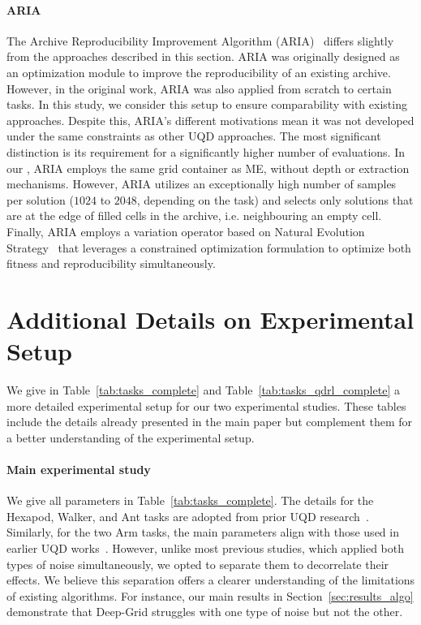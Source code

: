 \paragraph{ARIA}
The Archive Reproducibility Improvement Algorithm (ARIA)~\cite{grillotti2023don} differs slightly from the approaches described in this section. ARIA was originally designed as an optimization module to improve the reproducibility of an existing archive. However, in the original work, ARIA was also applied from scratch to certain tasks. In this study, we consider this setup to ensure comparability with existing approaches.
Despite this, ARIA’s different motivations mean it was not developed under the same constraints as other UQD approaches. The most significant distinction is its requirement for a significantly higher number of evaluations. In our \framework{}, ARIA employs the same grid container as ME, without depth or extraction mechanisms. However, ARIA utilizes an exceptionally high number of samples per solution ($1024$ to $2048$, depending on the task) and selects only solutions that are at the edge of filled cells in the archive, i.e. neighbouring an empty cell. Finally, ARIA employs a variation operator based on Natural Evolution Strategy~\cite{wierstra2014natural} that leverages a constrained optimization formulation to optimize both fitness and reproducibility simultaneously.



\section{Additional Details on Experimental Setup} \label{app:setup}


We give in Table~\ref{tab:tasks_complete} and Table~\ref{tab:tasks_qdrl_complete} a more detailed experimental setup for our two experimental studies. These tables include the details already presented in the main paper but complement them for a better understanding of the experimental setup. 

\paragraph{Main experimental study}
We give all parameters in Table~\ref{tab:tasks_complete}. 
The details for the Hexapod, Walker, and Ant tasks are adopted from prior UQD research~\cite{flageat2020fast, flageat2023uncertain, grillotti2023don, flageat2024exploring, mace2023quality}. Similarly, for the two Arm tasks, the main parameters align with those used in earlier UQD works~\cite{adaptive, flageat2020fast, flageat2023uncertain}. However, unlike most previous studies, which applied both types of noise simultaneously, we opted to separate them to decorrelate their effects.
We believe this separation offers a clearer understanding of the limitations of existing algorithms. For instance, our main results in Section~\ref{sec:results_algo} demonstrate that Deep-Grid struggles with one type of noise but not the other.

